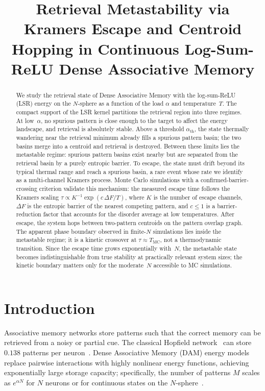\documentclass[11pt]{article}
\title{Retrieval Metastability via Kramers Escape and Centroid Hopping in Continuous Log-Sum-ReLU Dense Associative Memory}
\author{}
\date{}
\begin{document}
\maketitle

\begin{abstract}
We study the retrieval state of Dense Associative Memory with the log-sum-ReLU (LSR) energy on the $N$-sphere as a function of the load $\alpha$ and temperature~$T$.  The compact support of the LSR kernel partitions the retrieval region into three regimes.  At low~$\alpha$, no spurious pattern is close enough to the target to affect the energy landscape, and retrieval is absolutely stable.  Above a threshold $\alpha_{\mathrm{th}}$, the state thermally wandering near the retrieval minimum already fills a spurious pattern basin; the two basins merge into a centroid and retrieval is destroyed.  Between these limits lies the metastable regime: spurious pattern basins exist nearby but are separated from the retrieval basin by a purely entropic barrier.  To escape, the state must drift beyond its typical thermal range and reach a spurious basin, a rare event whose rate we identify as a multi-channel Kramers process.  Monte Carlo simulations with a confirmed-barrier-crossing criterion validate this mechanism: the measured escape time follows the Kramers scaling $\tau \propto K^{-1}\exp(c\,\Delta F/T)$, where $K$ is the number of escape channels, $\Delta F$ is the entropic barrier of the nearest competing pattern, and $c \leq 1$ is a barrier-reduction factor that accounts for the disorder average at low temperatures.  After escape, the system hops between two-pattern centroids on the pattern overlap graph.  The apparent phase boundary observed in finite-$N$ simulations lies inside the metastable regime; it is a kinetic crossover at $\tau \approx T_{\mathrm{MC}}$, not a thermodynamic transition.  Since the escape time grows exponentially with~$N$, the metastable state becomes indistinguishable from true stability at practically relevant system sizes; the kinetic boundary matters only for the moderate~$N$ accessible to MC simulations.
\end{abstract}

\section{Introduction}

Associative memory networks store patterns such that the correct memory can be retrieved from a noisy or partial cue. The classical Hopfield network~\citep{Hopfield1982} can store $0.138$ patterns per neuron~\citep{amit1987statistical}. Dense Associative Memory (DAM) energy models replace pairwise interactions with highly nonlinear energy functions, achieving exponentially large storage capacity; specifically, the number of patterns $M$ scales as $e^{\alpha N}$ for $N$ neurons or for continuous states on the $N$-sphere~\citep{demircigil2017model,ramsauer2021hopfield}.
\end{document}
